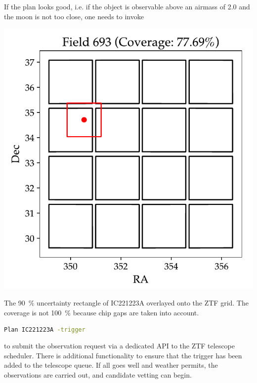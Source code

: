 \documentclass[
    a4paper, %
    fontsize=10pt, %
    twoside=true, %
    numbers=noenddot, %
    fontmethod=tex,
]{kaobook}
\begin{document}
If the plan looks good, i.e. if the object is observable above an airmass of 2.0 and the moon is not too close, one needs to invoke
\begin{marginfigure}
    \includegraphics{fu/planobs_grid.pdf}
    \caption[\texttt{planobs} ZTF grid]{The \SI{90}{\percent} uncertainty rectangle of IC221223A overlayed onto the ZTF grid. The coverage is not \SI{100}{\percent} because chip gaps are taken into account.}
\end{marginfigure}
\begin{lstlisting}[language=bash,style=kaolstplain]
Plan IC221223A -trigger
\end{lstlisting}

to submit the observation request via a dedicated API to the ZTF telescope scheduler. There is additional functionality to ensure that the trigger has been added to the telescope queue. If all goes well and weather permits, the observations are carried out, and candidate vetting can begin.
\end{document}
